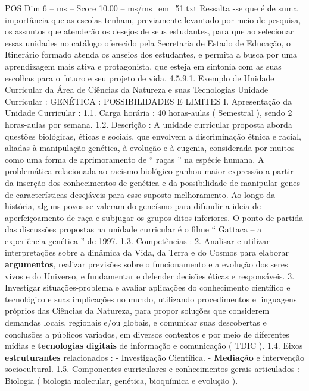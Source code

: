 \begin{textsample}{POS Dim 6 – ms – Score 10.00 – ms/ms\_em\_51.txt}
Ressalta -se que é de suma importância que as escolas tenham, previamente levantado por meio de pesquisa, os assuntos que atenderão os desejos de seus estudantes, para que ao selecionar essas unidades no catálogo oferecido pela Secretaria de Estado de Educação, o Itinerário formado atenda os anseios dos estudantes, e permita a busca por uma aprendizagem mais ativa e protagonista, que esteja em sintonia com as suas escolhas para o futuro e seu projeto de vida. 4.5.9.1.
Exemplo de Unidade Curricular da Área de Ciências da Natureza e suas Tecnologias Unidade Curricular : GENÉTICA : POSSIBILIDADES E LIMITES I.
Apresentação da Unidade Curricular : 1.1.
Carga horária : 40 horas-aulas ( Semestral ), sendo 2 horas-aulas por semana. 1.2.
Descrição : A unidade curricular proposta aborda questões biológicas, éticas e sociais, que envolvem a discriminação étnica e racial, aliadas à manipulação genética, à evolução e à eugenia, considerada por muitos como uma forma de aprimoramento de “ raças ” na espécie humana.
A problemática relacionada ao racismo biológico ganhou maior expressão a partir da inserção dos conhecimentos de genética e da possibilidade de manipular genes de características desejáveis para esse suposto melhoramento.
Ao longo da história, alguns povos se valeram do geneísmo para difundir a ideia de aperfeiçoamento de raça e subjugar os grupos ditos inferiores.
O ponto de partida das discussões propostas na unidade curricular é o filme “ Gattaca – a experiência genética ” de 1997. 1.3.
Competências : 2.
Analisar e utilizar interpretações sobre a dinâmica da Vida, da Terra e do Cosmos para elaborar \textbf{argumentos}, realizar previsões sobre o funcionamento e a evolução dos seres vivos e do Universo, e fundamentar e defender decisões éticas e responsáveis. 3.
Investigar situações-problema e avaliar aplicações do conhecimento científico e tecnológico e suas implicações no mundo, utilizando procedimentos e linguagens próprios das Ciências da Natureza, para propor soluções que considerem demandas locais, regionais e/ou globais, e comunicar suas descobertas e conclusões a públicos variados, em diversos contextos e por meio de diferentes mídias e \textbf{tecnologias} \textbf{digitais} de informação e comunicação ( TDIC ). 1.4.
Eixos \textbf{estruturantes} relacionados : - Investigação Científica. - \textbf{Mediação} e intervenção sociocultural. 1.5.
Componentes curriculares e conhecimentos gerais articulados : Biologia ( biologia molecular, genética, bioquímica e evolução ).

\end{textsample}
